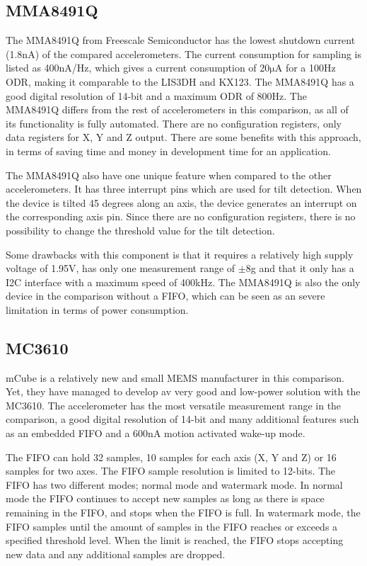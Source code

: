 \subsection{MMA8491Q}

The MMA8491Q from Freescale Semiconductor has the lowest shutdown current (1.8$\si{\nano\ampere}$) of the compared accelerometers. The current consumption for sampling is listed as 400nA/Hz, which gives a current consumption of 20$\si{\micro\ampere}$ for a 100Hz ODR, making it comparable to the LIS3DH and KX123. The MMA8491Q has a good digital resolution of 14-bit and a maximum ODR of 800Hz. The MMA8491Q differs from the rest of accelerometers in this comparison, as all of its functionality is fully automated. There are no configuration registers, only data registers for X, Y and Z output. There are some benefits with this approach, in terms of saving time and money in development time for an application. 

The MMA8491Q also have one unique feature when compared to the other accelerometers. It has three interrupt pins which are used for tilt detection. When the device is tilted 45 degrees along an axis, the device generates an interrupt on the corresponding axis pin. Since there are no configuration registers, there is no possibility to change the threshold value for the tilt detection. 

Some drawbacks with this component is that it requires a relatively high supply voltage of 1.95V, has only one measurement range of $\pm$8g and that it only has a I2C interface with a maximum speed of 400kHz. The MMA8491Q is also the only device in the comparison without a FIFO, which can be seen as an severe limitation in terms of power consumption.

\subsection{MC3610}
mCube is a relatively new and small MEMS manufacturer in this comparison. Yet, they have managed to develop av very good and low-power solution with the MC3610. The accelerometer has the most versatile measurement range in the comparison, a good digital resolution of 14-bit and many additional features such as an embedded FIFO and a 600nA motion activated wake-up mode. 

The FIFO can hold 32 samples, 10 samples for each axis (X, Y and Z) or 16 samples for two axes. The FIFO sample resolution is limited to 12-bits. The FIFO has two different modes; normal mode and watermark mode. In normal mode the FIFO continues to accept new samples as long as there is space remaining in the FIFO, and stops when the FIFO is full. In watermark mode, the FIFO samples until the amount of samples in the FIFO reaches or exceeds a specified threshold level. When the limit is reached, the FIFO stops accepting new data and any additional samples are dropped.


